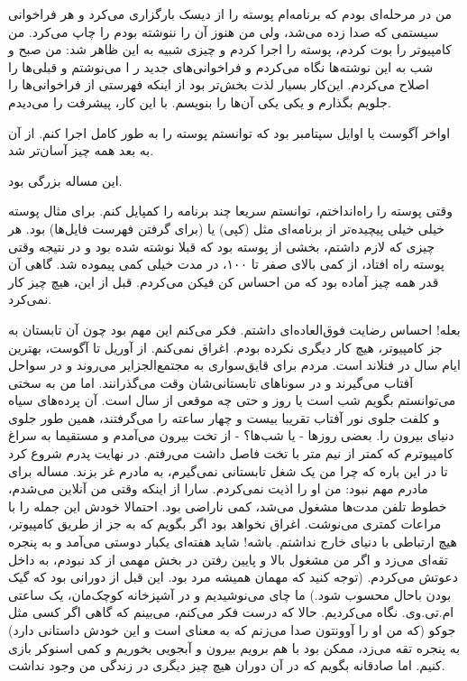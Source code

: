 من در مرحله‌ای بودم که برنامه‌ام پوسته را از دیسک بارگزاری می‌کرد و هر
فراخوانی سیستمی که صدا زده می‌شد، ولی من هنوز آن را ننوشته بودم را چاپ
می‌کرد. من کامپیوتر را بوت کردم، پوسته را اجرا کردم و چیزی شبیه به این
ظاهر شد:  من صبح و
شب به این نوشته‌ها نگاه می‌کردم و فراخوانی‌های جدید ر ا می‌نوشتم و قبلی‌ها
را اصلاح می‌کردم. این‌کار بسیار لذت بخش‌تر بود از اینکه فهرستی از
فراخوانی‌ها را جلویم بگذارم و یکی یکی آن‌ها را بنویسم. با این کار،
پیشرفت را می‌دیدم.

اواخر آگوست یا اوایل سپتامبر بود که توانستم پوسته را به طور کامل اجرا
کنم. از آن به بعد همه چیز آسان‌تر شد.

این مساله بزرگی بود. 

وقتی پوسته را راه‌انداختم، توانستم سریعا چند برنامه را کمپایل کنم. برای
مثال پوسته خیلی خیلی پیچیده‌تر از برنامه‌ای مثل  (کپی) یا
 (برای گرفتن فهرست فایل‌ها) بود. هر چیزی که لازم داشتم، بخشی از
پوسته بود که قبلا نوشته شده بود و در نتیجه وقتی پوسته راه افتاد، از
کمی بالای صفر تا ۱۰۰، در مدت خیلی کمی پیموده شد. گاهی آن قدر همه چیز
آماده بود که من احساس کن فیکن می‌کردم. قبل از این، هیچ چیز کار نمی‌کرد.

بعله! احساس رضایت فوق‌العاده‌ای داشتم. فکر می‌کنم این مهم بود چون آن
تابستان به جز کامپیوتر، هیچ کار دیگری نکرده بودم. اغراق نمی‌کنم. از
آوریل تا آگوست، بهترین ایام سال در فنلاند است. مردم برای قایق‌سواری به
مجتمع‌الجزایر می‌روند و در سواحل آفتاب می‌گیرند و در سوناهای تابستانی‌شان
وقت می‌گذرانند. اما من به سختی می‌توانستم بگویم شب است یا روز و حتی چه
موقعی از سال است. آن پرده‌های سیاه و کلفت جلوی نور آفتاب تقریبا بیست و
چهار ساعته را می‌گرفتند، همین طور جلوی دنیای بیرون را. بعضی روزها - یا
شب‌ها؟ - از تخت بیرون می‌آمدم و مستقیما به سراغ کامپیوترم که کمتر از
نیم‌ متر با تخت فاصل داشت می‌رفتم. در نهایت پدرم شروع کرد تا در این باره
که چرا من یک شغل تابستانی نمی‌گیرم،‌ به مادرم غر بزند. مساله برای مادرم
مهم نبود: من او را اذیت نمی‌کردم. سارا از اینکه وقتی من آنلاین می‌شدم،
خطوط تلفن مدت‌ها مشغول می‌شد، کمی ناراضی بود. احتمالا خودش این جمله را
با مراعات کمتری می‌نوشت. اغراق نخواهد بود اگر بگویم که به جز از طریق
کامپیوتر، هیچ ارتباطی با دنیای خارج نداشتم. باشه!‌ شاید هفته‌ای یکبار
دوستی می‌آمد و به پنجره تقه‌ای می‌زد و اگر من مشغول بالا و پایین رفتن در
بخش مهمی از کد نبودم، به داخل دعوتش می‌کردم. (توجه کنید که مهمان همیشه
مرد بود. این قبل از دورانی بود که گیک‌ بودن باحال محسوب شود.) ما چای
می‌نوشیدیم و در آشپزخانه کوچک‌مان، یک ساعتی ام.تی.وی. نگاه می‌کردیم. حالا
که درست فکر می‌کنم، می‌بینم که گاهی اگر کسی مثل جوکو (که من او را
آوونتون صدا می‌زنم که به معنای  است و این خودش داستانی
دارد) به پنجره تقه می‌زد، ممکن بود با هم برویم بیرون و آبجویی بخوریم و
کمی اسنوکر بازی کنیم. اما صادقانه بگویم که در آن دوران هیچ چیز دیگری
در زندگی من وجود نداشت.

